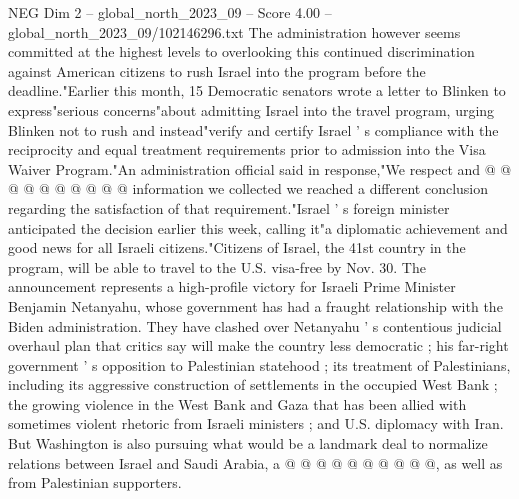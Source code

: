 \begin{textsample}{NEG Dim 2 – global\_north\_2023\_09 – Score 4.00 – global\_north\_2023\_09/102146296.txt}
The administration however seems committed at the highest levels to overlooking this continued discrimination against American citizens to rush Israel into the program before the deadline."Earlier this month, 15 Democratic senators wrote a letter to Blinken to express"serious concerns"about admitting Israel into the travel program, urging Blinken not to rush and instead"verify and certify Israel ' s compliance with the reciprocity and equal treatment requirements prior to admission into the Visa Waiver Program."An administration official said in response,"We respect and @ @ @ @ @ @ @ @ @ @ information we collected we reached a different conclusion regarding the satisfaction of that requirement."Israel ' s foreign minister anticipated the decision earlier this week, calling it"a diplomatic achievement and good news for all Israeli citizens."Citizens of Israel, the 41st country in the program, will be able to travel to the U.S. visa-free by Nov. 30.
The announcement represents a high-profile victory for Israeli Prime Minister Benjamin Netanyahu, whose government has had a fraught relationship with the Biden administration.
They have clashed over Netanyahu ' s contentious judicial overhaul plan that critics say will make the country less democratic ; his far-right government ' s opposition to Palestinian statehood ; its treatment of Palestinians, including its aggressive construction of settlements in the occupied West Bank ; the growing violence in the West Bank and Gaza that has been allied with sometimes violent rhetoric from Israeli ministers ; and U.S. diplomacy with Iran.
But Washington is also pursuing what would be a landmark deal to normalize relations between Israel and Saudi Arabia, a @ @ @ @ @ @ @ @ @ @, as well as from Palestinian supporters.

\end{textsample}
